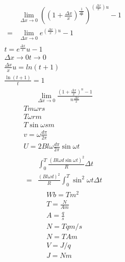 \documentclass{article}
\begin{document}
  \begin{gather*}
    \begin{aligned}
      & \lim_{\Delta x \to 0}
        \left(
          \left(
            1+\frac{\Delta x}{x}
          \right)^{\frac{1}{\frac{\Delta x}{x}}}
        \right)^{\left(\frac{\Delta x}{x}\right)u}
      -1 \\
      = & \lim_{\Delta x \to 0}
        e^{\left(\frac{\Delta x}{x}\right)u} -1
    \end{aligned} \\
    t = e^{\frac{\Delta x}{x}}u-1 \\
    \Delta x \to 0 t \to 0 \\
    \frac{\Delta x}{x}u=ln(t+1) \\
    \frac{\ln(t+1)}{t} = 1
  \end{gather*}
  \begin{gather*}
    \lim_{\Delta x \to 0}
    \frac{\left(1 + \frac{\Delta x}{x}\right)^n - 1}{n\frac{\Delta x}{x}}
  \end{gather*}
  \begin{gather*}
    T m \omega r s \\
    T \omega r m \\
    T \sin{\omega s} m \\
    v = \omega\frac{d\pi}{2\pi} \\
    U = 2 B l \omega\frac{d\pi}{2\pi} \sin{\omega t} \\
    \begin{aligned}
      & \int_0^T \frac{(Bl \omega d \sin{\omega t})^2}{R} \Delta t \\
      = & \frac{(Bl\omega d)^2}{R} \int_{0}^{T} \sin^2 \omega t \Delta t
    \end{aligned}
  \end{gather*}
  \begin{gather*}
    Wb = Tm^2 \\
    T = \frac{N}{Am} \\
    A = \frac{q}{s} \\
    N = Tqm/s \\
    N = TAm \\
    V = J/q \\
    J = Nm
  \end{gather*}
\end{document}
